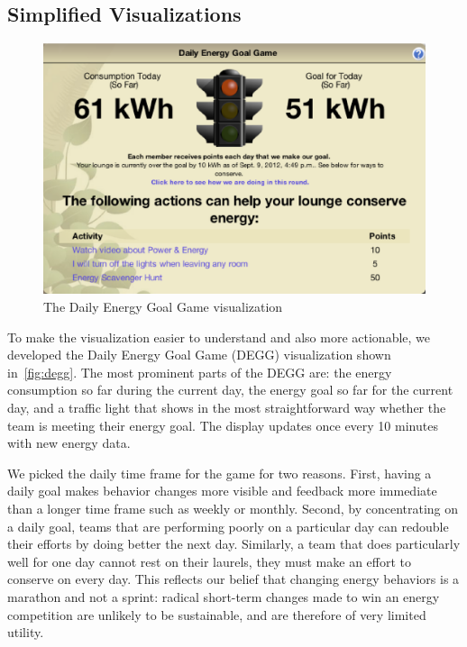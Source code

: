 \documentclass{sigchi}
\begin{document}
\subsection{Simplified Visualizations}
\label{sec:simple-viz}

\begin{figure}[!t]
\centering
\includegraphics[width=0.95\columnwidth]{degg.eps}
\caption{The Daily Energy Goal Game visualization}
\label{fig:degg}
\end{figure}

To make the visualization easier to understand and also more actionable, we developed the Daily Energy Goal Game (DEGG) visualization shown in~\autoref{fig:degg}. The most prominent parts of the DEGG are: the energy consumption so far during the current day, the energy goal so far for the current day, and a traffic light that shows in the most straightforward way whether the team is meeting their energy goal. The display updates once every 10 minutes with new energy data.

We picked the daily time frame for the game for two reasons. First, having a daily goal makes behavior changes more visible and feedback more immediate than a longer time frame such as weekly or monthly. Second, by concentrating on a daily goal, teams that are performing poorly on a particular day can redouble their efforts by doing better the next day. Similarly, a team that does particularly well for one day cannot rest on their laurels, they must make an effort to conserve on every day. This reflects our belief that changing energy behaviors is a marathon and not a sprint: radical short-term changes made to win an energy competition are unlikely to be sustainable, and are therefore of very limited utility.
\end{document}
